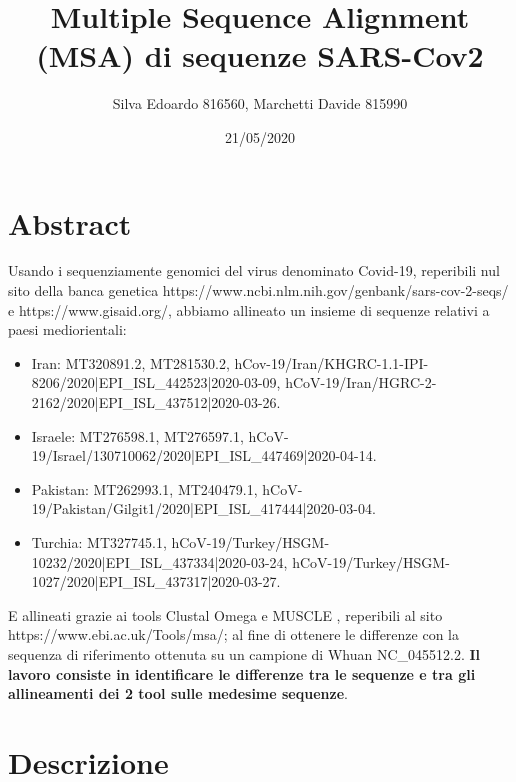 \documentclass[12pt]{article}
\title{Multiple Sequence Alignment (MSA) di sequenze SARS-Cov2}
\date{21/05/2020}
\author{Silva Edoardo 816560, Marchetti Davide 815990}
\begin{document}
\maketitle

\section*{Abstract}

	Usando i sequenziamente genomici del virus denominato Covid-19, reperibili nul sito della banca genetica https://www.ncbi.nlm.nih.gov/genbank/sars-cov-2-seqs/ e https://www.gisaid.org/, abbiamo allineato un insieme di sequenze relativi a paesi mediorientali:
	\begin{itemize}
		\item Iran: MT320891.2, MT281530.2, hCov-19/Iran/KHGRC-1.1-IPI-8206/2020|EPI\_ISL\_442523|2020-03-09, hCoV-19/Iran/HGRC-2-2162/2020|EPI\_ISL\_437512|2020-03-26. %
		\item Israele: MT276598.1, MT276597.1, hCoV-19/Israel/130710062/2020|EPI\_ISL\_447469|2020-04-14.
		\item Pakistan: MT262993.1, MT240479.1, hCoV-19/Pakistan/Gilgit1/2020|EPI\_ISL\_417444|2020-03-04.
		\item Turchia: MT327745.1, hCoV-19/Turkey/HSGM-10232/2020|EPI\_ISL\_437334|2020-03-24, hCoV-19/Turkey/HSGM-1027/2020|EPI\_ISL\_437317|2020-03-27.
	\end{itemize}
	E allineati grazie ai tools Clustal Omega e MUSCLE , reperibili al sito https://www.ebi.ac.uk/Tools/msa/; al fine di ottenere le differenze con la sequenza di riferimento ottenuta su un campione di Whuan NC\_045512.2.\newline
	\textbf{Il lavoro consiste in identificare le differenze tra le sequenze e tra gli allineamenti dei 2 tool sulle medesime sequenze}. \newpage
\section{Descrizione}
	
\end{document}
